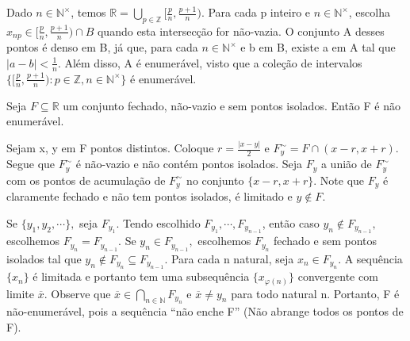 \documentclass[analysis_notes.tex]{subfiles}
\begin{document}
\begin{proof*}
	Dado $n\in \mathbb{N}^{\times}$, temos $\mathbb{R} = \displaystyle\bigcup_{p\in \mathbb{Z}}^{}{\biggl[\frac{p}{n}, \frac{p+1}{n}\biggr)}$. Para
	cada p inteiro e $n\in \mathbb{N}^{\times}$, escolha $x_{np}\in\biggl[\frac{p}{n}, \frac{p+1}{n}\biggr)\cap{B}$ quando esta intersec\c c\~ao
	for n\~ao-vazia. O conjunto A desses pontos \'e denso em B, j\'a que, para cada $n\in \mathbb{N}^{\times}$ e b em B, existe a em A
	tal que $|a-b|<\frac{1}{n}$. Al\'em disso, A \'e enumer\'avel, visto que a cole\c c\~ao de intervalos $\biggl\{\biggl[\frac{p}{n}, \frac{p+1}{n}\biggr): p\in \mathbb{Z}, n\in \mathbb{N}^{\times}\biggr\}$
	\'e enumer\'avel.\qedsymbol
\end{proof*}
\begin{theorem*}
	Seja $F\subseteq{\mathbb{R}}$ um conjunto fechado, n\~ao-vazio e sem pontos isolados. Ent\~ao F \'e n\~ao enumer\'avel.
\end{theorem*}
\begin{proof*}
	Sejam x, y em F pontos distintos. Coloque $r = \frac{|x-y|}{2}$ e $F_{y}^{\sim} = F\cap{(x-r, x+r)}.$ Segue que $F_{y}^{\sim}$
	\'e n\~ao-vazio e n\~ao cont\'em pontos isolados. Seja $F_{y}$ a uni\~ao de $F_{y}^{\sim}$ com os pontos de acumula\c c\~ao de
	$F_{y}^{\sim}$ no conjunto $\{x-r,x+r\}.$ Note que $F_{y}$ \'e claramente fechado e n\~ao tem pontos isolados, \'e limitado e
	$y\not\in F.$

	Se $\{y_{1},y_{2},\cdots\},$ seja $F_{y_{1}}.$ Tendo escolhido $F_{y_{1}},\cdots, F_{y_{n-1}}$, ent\~ao caso $y_{n}\not\in F_{y_{n-1}},$
	escolhemos $F_{y_{n}}=F_{y_{n-1}}.$ Se $y_{n}\in F_{y_{n-1}},$ escolhemos $F_{y_{n}}$ fechado e sem pontos isolados tal que
	$y_{n}\not\in F_{y_{n}}\subseteq{F_{y_{n-1}}}.$ Para cada n natural, seja $x_{n}\in F_{y_{n}}.$ A sequ\^encia $\{x_{n}\}$ \'e limitada
	e portanto tem uma subsequ\^encia $\{x_{\varphi(n)}\}$ convergente com limite $\overline{x}$. Observe que $\overline{x}\in \bigcap_{n\in \mathbb{N}}^{}{F_{y_{n}}}$
	e $\overline{x}\neq y_{n}$ para todo natural n. Portanto, F \'e n\~ao-enumer\'avel, pois a sequ\^encia ``n\~ao enche F'' (N\~ao abrange
	todos os pontos de F). \qedsymbol
\end{proof*}
\end{document}

